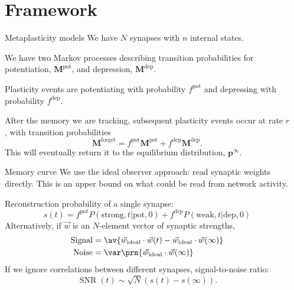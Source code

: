 \documentclass[final,hyperref={pdfpagelabels=false,bookmarks=false}]{beamer}
\DeclareMathOperator{\SNR}{SNR}
\newcommand{\pot}{^\text{pot}}
\newcommand{\dep}{^\text{dep}}
\newcommand{\frg}{^\text{forget}}
\newcommand{\eq}{\mathbf{p}^\infty}
\newcommand{\W}{\vec{w}}
\newcommand{\M}{\mathbf{M}}
\begin{document}
\begin{frame}{}
\begin{columns}[t]
\begin{column}{0.32\linewidth}
\end{column}

\begin{column}{0.32\linewidth}

\section{Framework}


\begin{block}{Metaplasticity models}
%
 We have $N$ synapses with $n$ internal states.

 We have two Markov processes describing transition probabilities for potentiation, $\M\pot$, and depression, $\M\dep$.

 \vp Plasticity events are potentiating with probability $f\pot$ and depressing with probability $f\dep$.

 \vp After the memory we are tracking, subsequent plasticity events occur at rate $r$, with transition probabilities
 \begin{equation*}
   \M\frg = f\pot\M\pot + f\dep\M\dep.
 \end{equation*}
 This will eventually return it to the equilibrium distribution, $\eq$.
%
\end{block}


\begin{block}{Memory curve}
%
 We use the ideal observer approach: read synaptic weights directly.
 This is an upper bound on what could be read from network activity.

 Reconstruction probability of a single synapse:
 \begin{equation*}
   s(t) = f\pot P(\text{strong},t|\text{pot},0) + f\dep P(\text{weak},t|\text{dep},0)
 \end{equation*}
 Alternatively, if $\W$ is an $N$-element vector of synaptic strengths,
 \begin{equation*}
   \begin{aligned}
     \text{Signal} &= \av{\W_\text{ideal} \cdot \W(t) -  \W_\text{ideal} \cdot \W(\infty)}\\
     \text{Noise} &= \var\prn{\W_\text{ideal} \cdot \W(\infty)}
   \end{aligned}
 \end{equation*}
 If we ignore correlations between different synapses, signal-to-noise ratio:
 \begin{equation*}
   \SNR(t) \sim \sqrt{N}(s(t)-s(\infty)).
 \end{equation*}
%
\end{block}



\end{column}
\end{columns}
\end{frame}
\end{document}
